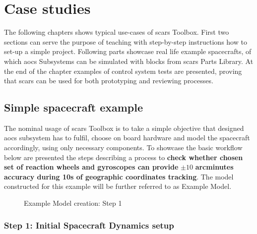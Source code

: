 \section{Case studies}\label{sec:examples}
    The following chapters shows typical use-cases of \ac{scars} Toolbox. First two sections can serve the purpose of teaching with step-by-step instructions how to set-up a simple project. Following parts showcase real life example spacecrafts, of which \ac{aocs} Subsystems can be simulated with blocks from \ac{scars} Parts Library. At the end of the chapter examples of control system tests are presented, proving that \ac{scars} can be used for both prototyping and reviewing processes.


    \subsection{Simple spacecraft example}\label{sec:simple_spacecraft}
        The nominal usage of \ac{scars} Toolbox is to take a simple objective that designed \ac{aocs} subsystem has to fulfil, choose on board hardware and model the spacecraft accordingly, using only necessary components. To showcase the basic workflow below are presented the steps describing a process to \textbf{check whether chosen set of reaction wheels and gyroscopes can provide} $\pm10$ \textbf{arcminutes accuracy during 10s of geographic coordinates tracking}. The model constructed for this example will be further referred to as Example Model. 

        \begin{figure}[H]
            \centering
            \quad
            \caption{Example Model creation: Step 1}%
            \label{fig:step1}%
        \end{figure}

        \subsubsection*{Step 1: Initial Spacecraft Dynamics setup}

